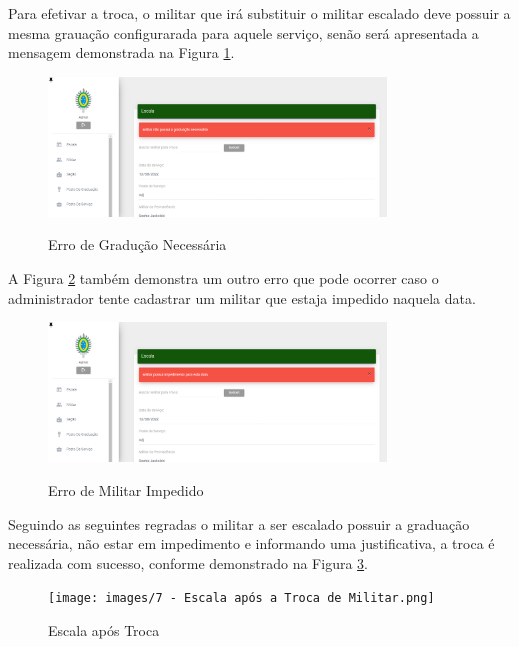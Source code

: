 Para efetivar a troca, o militar que irá substituir o militar escalado deve possuir a mesma grauação configurarada para aquele serviço, senão será apresentada a mensagem demonstrada na Figura \ref{fig:formreplaceerror}.

\begin{figure}[!htb]
    \centering
    \caption{Erro de Gradução Necessária}
    \includegraphics[width=0.8\textwidth]{images/7 - Erro Troca de Militar - Graduação.png}
    \label{fig:formreplaceerror}
\end{figure}

A Figura \ref{fig:formreplaceerror2} também demonstra um outro erro que pode ocorrer caso o administrador tente cadastrar um militar que estaja impedido naquela data.

\begin{figure}[!htb]
    \centering
    \caption{Erro de Militar Impedido}
    \includegraphics[width=0.8\textwidth]{images/7 - Erro Troca de Militar - Impedimento.png}
    \label{fig:formreplaceerror2}
\end{figure}

Seguindo as seguintes regradas o militar a ser escalado possuir a graduação necessária, não estar em impedimento e informando uma justificativa, a troca é realizada com sucesso, conforme demonstrado na Figura \ref{fig:formreplacesuccess}.

\begin{figure}[H]
    \centering
    \caption{Escala após Troca}
    \texttt{[image: images/7 - Escala após a Troca de Militar.png]}
    \label{fig:formreplacesuccess}
\end{figure}


